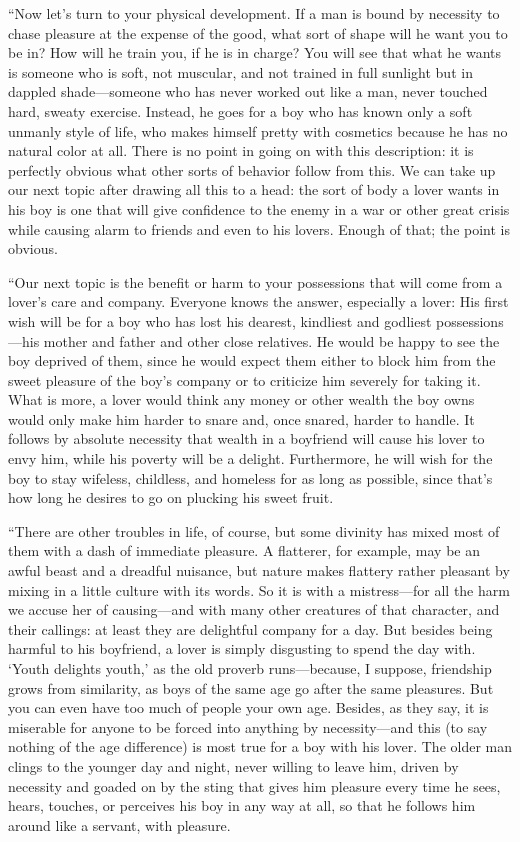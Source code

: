 “Now let's turn to your physical development. If a man is bound by
necessity to chase pleasure at the expense of the good, what sort of
shape will he want you to be in? How will he train you, if he is in
charge? You will see that what he wants is someone who is soft, not
muscular, and not trained in full sunlight but in dappled
shade---someone who has never worked out like a man, never touched hard,
sweaty exercise. Instead, he goes for a boy who has known only a
soft unmanly style of life, who makes himself pretty with cosmetics
because he has no natural color at all. There is no point in going on
with this description: it is perfectly obvious what other sorts of
behavior follow from this. We can take up our next topic after drawing
all this to a head: the sort of body a lover wants in his boy is one
that will give confidence to the enemy in a war or other great crisis
while causing alarm to friends and even to his lovers. Enough of that;
the point is obvious.

“Our next topic is the benefit or harm to your possessions that
will come from a lover's care and company. Everyone knows the answer,
especially a lover: His first wish will be for a boy who has lost his
dearest, kindliest and godliest possessions---his mother and father and
other close relatives. He would be happy to see the boy deprived of
them, since he would expect them either to block him
from the sweet pleasure of the boy's company or to criticize him
severely for taking it. What is more, a lover would think any money or
other wealth the boy owns would only make him harder to snare and, once
snared, harder to handle. It follows by absolute necessity that wealth
in a boyfriend will cause his lover to envy him, while his poverty will
be a delight. Furthermore, he will wish for the boy to stay wifeless,
childless, and homeless for as long as possible, since that's how long
he desires to go on plucking his sweet fruit.

“There are other troubles in life, of course, but some divinity has
mixed most of them with a dash of immediate pleasure. A flatterer, for
example, may be an awful beast and a dreadful nuisance, but
nature makes flattery rather pleasant by mixing in a little culture with
its words. So it is with a mistress---for all the harm we accuse her of
causing---and with many other creatures of that character, and their
callings: at least they are delightful company for a day. But besides
being harmful to his boyfriend, a lover is simply disgusting to
spend the day with. ‘Youth delights youth,' as the old proverb
runs---because, I suppose, friendship grows from similarity, as boys of
the same age go after the same pleasures. But you can even have too much
of people your own age. Besides, as they say, it is miserable for anyone
to be forced into anything by necessity---and this (to say nothing of
the age difference) is most true for a boy with his lover. The older man
clings to the younger day and night, never willing to leave him, driven 
by necessity and goaded on by the sting that gives him pleasure
every time he sees, hears, touches, or perceives his boy in any way at
all, so that he follows him around like a servant, with pleasure.


